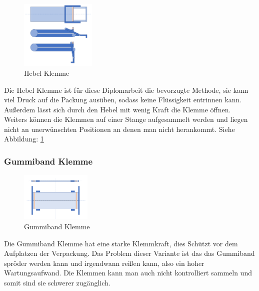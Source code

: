 \begin{figure}
\vspace{-30pt}
  \begin{center}
    \includegraphics[width=0.32\textwidth]{Bilder/Powerpoint/Hebel_Klemme}
  \end{center}
  \caption{Hebel Klemme}
  \label{Hebel Klemme}
  \vspace{-10pt}
\end{figure}

Die Hebel Klemme ist für diese Diplomarbeit die bevorzugte Methode, sie kann viel Druck auf die Packung ausüben, sodass keine Flüssigkeit entrinnen kann. Außerdem lässt sich durch den Hebel mit wenig Kraft die Klemme öffnen. Weiters können die Klemmen auf einer Stange aufgesammelt werden und liegen nicht an unerwünschten Positionen an denen man nicht herankommt. Siehe Abbildung: \ref{Hebel Klemme}
 \vspace{40pt}


\subsubsection{Gummiband Klemme}
 
\begin{figure}
\vspace{-40pt}
  \begin{center}
    \includegraphics[width=0.30\textwidth]{Bilder/Powerpoint/Gummiband_Klemme}
  \end{center}
  \caption{Gummiband Klemme}
  \label{Gummiband Klemme}
  \vspace{-10pt}
\end{figure}

Die Gummiband Klemme hat eine starke Klemmkraft, dies Schützt vor dem Aufplatzen der Verpackung. Das Problem dieser Variante ist das das Gummiband spröder werden kann und irgendwann reißen kann, also ein hoher Wartungsaufwand. Die Klemmen kann man auch nicht kontrolliert sammeln und somit sind sie schwerer zugänglich.

